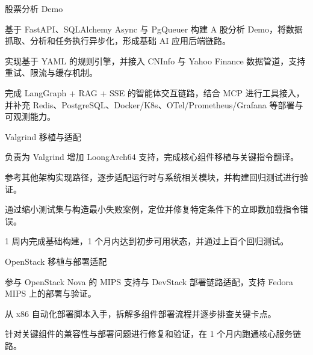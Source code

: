 

\begin{cventries}

\cventry
  {} %
  {股票分析 Demo} %
  {} %
  {} %
  {
    \begin{cvitems}
      \item {基于 FastAPI、SQLAlchemy Async 与 PgQueuer 构建 A 股分析 Demo，将数据抓取、分析和任务执行异步化，形成基础 AI 应用后端链路。}
      \item {实现基于 YAML 的规则引擎，并接入 CNInfo 与 Yahoo Finance 数据管道，支持重试、限流与缓存机制。}
      \item {完成 LangGraph + RAG + SSE 的智能体交互链路，结合 MCP 进行工具接入，并补充 Redis、PostgreSQL、Docker/K8s、OTel/Prometheus/Grafana 等部署与可观测能力。}
    \end{cvitems}
  }

\cventry
  {} %
  {Valgrind 移植与适配} %
  {} %
  {} %
  {
    \begin{cvitems}
      \item {负责为 Valgrind 增加 LoongArch64 支持，完成核心组件移植与关键指令翻译。}
      \item {参考其他架构实现路径，逐步适配运行时与系统相关模块，并构建回归测试进行验证。}
      \item {通过缩小测试集与构造最小失败案例，定位并修复特定条件下的立即数加载指令错误。}
      \item {1 周内完成基础构建，1 个月内达到初步可用状态，并通过上百个回归测试。}
    \end{cvitems}
  }

\cventry
  {} %
  {OpenStack 移植与部署适配} %
  {} %
  {} %
  {
    \begin{cvitems}
      \item {参与 OpenStack Nova 的 MIPS 支持与 DevStack 部署链路适配，支持 Fedora MIPS 上的部署与验证。}
      \item {从 x86 自动化部署脚本入手，拆解多组件部署流程并逐步排查关键卡点。}
      \item {针对关键组件的兼容性与部署问题进行修复和验证，在 1 个月内跑通核心服务链路。}
    \end{cvitems}
  }


\end{cventries}
